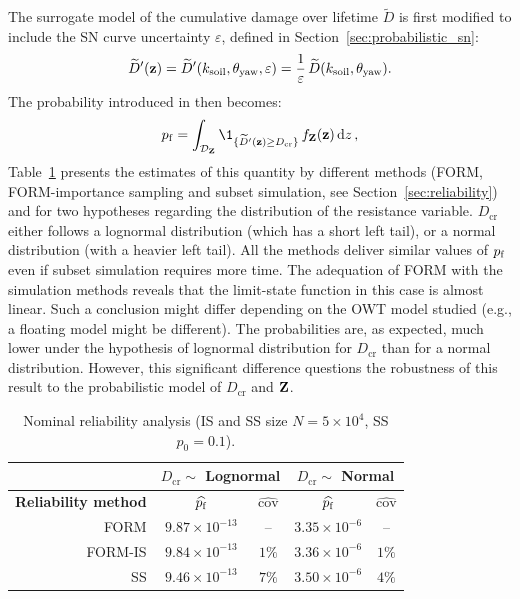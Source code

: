 The surrogate model of the cumulative damage over lifetime $\widetilde{D}$ is first modified to include the SN curve uncertainty $\varepsilon$, defined in Section~\ref{sec:probabilistic_sn}:
\begin{equation}
    \widetilde{D}'({\bf z}) = \widetilde{D}'(k_{\mathrm{soil}}, \theta_{\mathrm{yaw}}, \varepsilon) = \frac1\varepsilon \, \widetilde{D}(k_{\mathrm{soil}}, \theta_{\mathrm{yaw}}).
\end{equation} 
The probability introduced in  then becomes: 
\begin{equation}
    \pf = \int_{\iD_\bZ} \1_{\{\widetilde{D}'(\bz) \geq D_{\mathrm{cr}}\}} \, f_\bZ(\bz) \, \dd z \,,
    \label{eq:owt_pf_surrogate}
\end{equation}
Table~\ref{tab:pf_result_table} presents the estimates of this quantity by different methods (FORM, FORM-importance sampling and subset simulation, see Section~\ref{sec:reliability}) and for two hypotheses regarding the distribution of the resistance variable. 
$D_{\mathrm{cr}}$ either follows a lognormal distribution (which has a short left tail), or a normal distribution (with a heavier left tail). 
All the methods deliver similar values of $p_\mathrm{f}$ even if subset simulation requires more time. 
The adequation of FORM with the simulation methods reveals that the limit-state function in this case is almost linear. 
Such a conclusion might differ depending on the OWT model studied (e.g., a floating model might be different). 
The probabilities are, as expected, much lower under the hypothesis of lognormal distribution for $D_{\mathrm{cr}}$ than for a normal distribution. 
However, this significant difference questions the robustness of this result to the probabilistic model of $D_{\mathrm{cr}}$ and ${\bf Z}$.  

\begin{table}[h]
    \centering
    \caption{Nominal reliability analysis (IS and SS size $N=5 \times 10^4$, SS $p_0=0.1$).}
    \begin{tabular}{r||c|c|c|c}
              &  \multicolumn{2}{c|}{$D_{\mathrm{cr}} \sim $ \bf Lognormal} & \multicolumn{2}{c}{$D_{\mathrm{cr}} \sim $ \bf Normal}\\
    \hline
    \bf Reliability method & $\widehat{p_\mathrm{f}}$       & $\widehat{\mathrm{cov}}$    & $\widehat{p_\mathrm{f}}$       & $\widehat{\mathrm{cov}}$ \\
    \hline\hline
    FORM      & $9.87 \times 10^{-13}$ & --                    & $3.35 \times 10^{-6}$ & --\\
    \hline
    FORM-IS   & $9.84 \times 10^{-13}$ & $1 \%$                & $3.36 \times 10^{-6}$ & $1 \%$\\
    \hline
    SS        & $9.46 \times 10^{-13}$ & $7 \%$               & $3.50 \times 10^{-6}$ & $4 \%$\\ 
    \end{tabular}
    \label{tab:pf_result_table}
\end{table}


